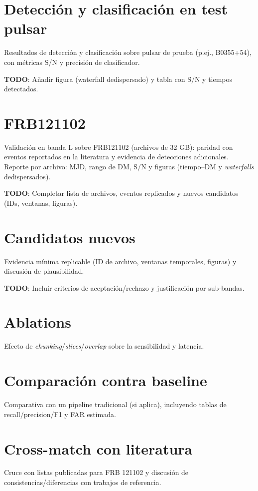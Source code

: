 
\section{Detección y clasificación en test pulsar}
Resultados de detección y clasificación sobre pulsar de prueba (p.ej., B0355+54), con métricas S/N y precisión de clasificador.

\textbf{TODO}: Añadir figura (waterfall dedispersado) y tabla con S/N y tiempos detectados.

\section{FRB121102}
Validación en banda L sobre FRB121102 (archivos de 32 GB): paridad con eventos reportados en la literatura y evidencia de detecciones adicionales. Reporte por archivo: MJD, rango de DM, S/N y figuras (tiempo--DM y \textit{waterfalls} dedispersados).

\textbf{TODO}: Completar lista de archivos, eventos replicados y nuevos candidatos (IDs, ventanas, figuras).

\section{Candidatos nuevos}
Evidencia mínima replicable (ID de archivo, ventanas temporales, figuras) y discusión de plausibilidad.

\textbf{TODO}: Incluir criterios de aceptación/rechazo y justificación por sub-bandas.

\section{Ablations}
Efecto de \textit{chunking}/\textit{slices}/\textit{overlap} sobre la sensibilidad y latencia.

\section{Comparación contra baseline}
Comparativa con un pipeline tradicional (si aplica), incluyendo tablas de recall/precision/F1 y FAR estimada.

\section{Cross-match con literatura}
Cruce con listas publicadas para FRB 121102 y discusión de consistencias/diferencias con trabajos de referencia.
